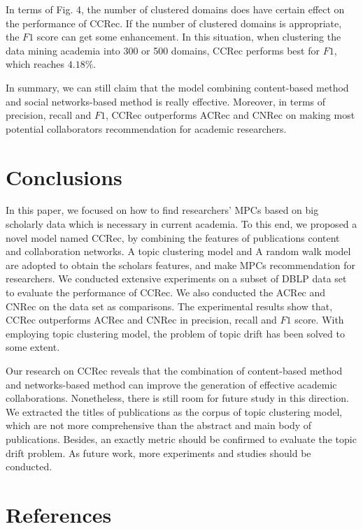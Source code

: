 \documentclass[review]{elsarticle}
\begin{document}
In terms of Fig. 4, the number of clustered domains does have certain effect on the performance of CCRec. If the number of clustered domains is appropriate, the $F1$ score can get some enhancement. In this situation, when clustering the data mining academia into 300 or 500 domains, CCRec performs best for $F1$, which reaches $4.18\%$.

In summary, we can still claim that the model combining content-based method and social networks-based method is really effective. Moreover, in terms of precision, recall and $F1$, CCRec outperforms ACRec and CNRec on making most potential collaborators recommendation for academic researchers.
\section{Conclusions}
In this paper, we focused on how to find researchers' MPCs based on big scholarly data which is necessary in current academia. To this end, we proposed a novel model named CCRec, by combining the features of publications content and collaboration networks. A topic clustering model and A random walk model are adopted to obtain the scholars features, and make MPCs recommendation for researchers. We conducted extensive experiments on a subset of DBLP data set to evaluate the performance of CCRec. We also conducted the ACRec and CNRec on the data set as comparisons. The experimental results show that, CCRec outperforms ACRec and CNRec in precision, recall and $F1$ score. With employing topic clustering model, the problem of topic drift has been solved to some extent.

Our research on CCRec reveals that the combination of content-based method and networks-based method can improve the generation of effective academic collaborations. Nonetheless, there is still room for future study in this direction. We extracted the titles of publications as the corpus of topic clustering model, which are not more comprehensive than the abstract and main body of publications. Besides, an exactly metric should be confirmed to evaluate the topic drift problem. As future work, more experiments and studies should be conducted.

\section*{References}


\end{document}
